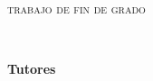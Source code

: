 
\begin{titlepage}
  \AddToShipoutPicture*{\BackgroundPic}

  \begin{addmargin}[-0.5cm]{-2.5cm}
  \begin{center}
    \large  


    \hfill

    \vfill

    \textsc{trabajo de fin de grado} 

    \vfill
    \begingroup
    \huge{\miTitulo} \\ \bigskip
    \endgroup

    {\Large\textsf{\miNombre}}

    \vfill\vfill\vfill\vfill

    \begin{minipage}[t]{0.15\textwidth}
      \textbf{Tutores}
    \end{minipage}
    \begin{minipage}[t]{0.55\textwidth}
      \flushleft
     \miTutor
    \end{minipage}
    \begin{minipage}[t]{0.30\textwidth}
      \flushright
      \miGrado 
      \medskip

      \miFacultad
      \medskip
      
      \miCurso
    \end{minipage}
  \end{center}  
  \end{addmargin}       

\end{titlepage}   
\cleardoublepage
\endinput
